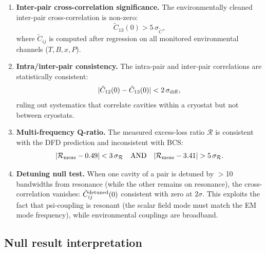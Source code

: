 \documentclass[11pt]{article}
\begin{document}
\begin{tcolorbox}[colback=green!5!white, colframe=green!60!black,
  title=\textbf{DETECTION CRITERIA (5$\sigma$ discovery)}]
\begin{enumerate}[label=\textbf{C\arabic*.}, itemsep=8pt]

\item \textbf{Inter-pair cross-correlation significance.}
  The environmentally cleaned inter-pair cross-correlation is non-zero:
  \begin{equation}
  \tilde{C}_{13}(0) > 5\,\sigma_{\tilde{C}},
  \end{equation}
  where $\tilde{C}_{ij}$ is computed after regression on all monitored
  environmental channels ($T, B, x, P$).

\item \textbf{Intra/inter-pair consistency.}
  The intra-pair and inter-pair correlations are statistically consistent:
  \begin{equation}
  |\tilde{C}_{12}(0) - \tilde{C}_{13}(0)| < 2\,\sigma_{\rm diff},
  \end{equation}
  ruling out systematics that correlate cavities within a cryostat
  but not between cryostats.

\item \textbf{Multi-frequency Q-ratio.}
  The measured excess-loss ratio $\mathcal{R}$ is consistent with the
  DFD prediction and inconsistent with BCS:
  \begin{equation}
  |\mathcal{R}_{\rm meas} - 0.49| < 3\,\sigma_{\mathcal{R}}
  \quad\text{AND}\quad
  |\mathcal{R}_{\rm meas} - 3.41| > 5\,\sigma_{\mathcal{R}}.
  \end{equation}

\item \textbf{Detuning null test.}
  When one cavity of a pair is detuned by $>$10 bandwidths from
  resonance (while the other remains on resonance), the cross-correlation
  vanishes:
  $\tilde{C}_{ij}^{\rm detuned}(0)$ consistent with zero at $2\sigma$.
  This exploits the fact that psi-coupling is resonant (the scalar field
  mode must match the EM mode frequency), while environmental couplings
  are broadband.

\end{enumerate}
\end{tcolorbox}

\subsection{Null result interpretation}
\end{document}
